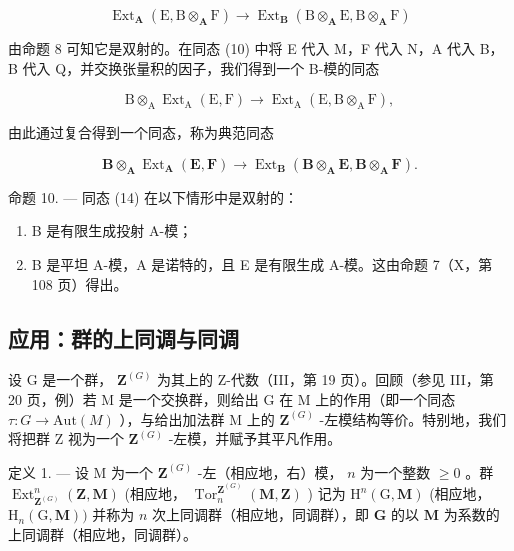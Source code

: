 \[
\operatorname{Ext} _ {\mathbf {A}} \left(\mathrm{E}, \mathrm{B} \otimes_ {\mathbf {A}} \mathrm{F}\right)\rightarrow \operatorname{Ext} _ {\mathbf {B}} \left(\mathrm{B} \otimes_ {\mathbf {A}} \mathrm{E}, \mathrm{B} \otimes_ {\mathbf {A}} \mathrm{F}\right)
\]

由命题 8 可知它是双射的。在同态 (10) 中将 E 代入 M，F 代入 N，A 代入 B，B 代入 Q，并交换张量积的因子，我们得到一个 B-模的同态

\[
\mathrm{B} \otimes_ {\mathrm{A}} \operatorname{Ext} _ {\mathrm{A}} (\mathrm{E}, \mathrm{F}) \rightarrow \operatorname{Ext} _ {\mathrm{A}} (\mathrm{E}, \mathrm{B} \otimes_ {\mathrm{A}} \mathrm{F}),
\]

由此通过复合得到一个同态，称为典范同态

\[
\mathbf {B} \otimes_ {\mathbf {A}} \operatorname{Ext} _ {\mathbf {A}} (\mathbf {E}, \mathbf {F}) \rightarrow \operatorname{Ext} _ {\mathbf {B}} (\mathbf {B} \otimes_ {\mathbf {A}} \mathbf {E}, \mathbf {B} \otimes_ {\mathbf {A}} \mathbf {F}).\tag{14}
\]

命题 10. --- 同态 (14) 在以下情形中是双射的：

\begin{enumerate}
\def\labelenumi{\alph{enumi})}
\item
  B 是有限生成投射 A-模；
\item
  B 是平坦 A-模，A 是诺特的，且 E 是有限生成 A-模。这由命题 7（X，第 108 页）得出。
\end{enumerate}

\subsection{应用：群的上同调与同调}

设 G 是一个群， \(\mathbf{Z}^{(G)}\) 为其上的 Z-代数（III，第 19 页）。回顾（参见 III，第 20 页，例）若 M 是一个交换群，则给出 G 在 M 上的作用（即一个同态 \(\tau: G \to \text{Aut}(M)\) ），与给出加法群 M 上的 \(\mathbf{Z}^{(G)}\) -左模结构等价。特别地，我们将把群 Z 视为一个 \(\mathbf{Z}^{(G)}\) -左模，并赋予其平凡作用。

定义 1. --- 设 M 为一个 \(\mathbf{Z}^{(G)}\) -左（相应地，右）模， \(n\) 为一个整数 \(\geqslant 0\) 。群 \(\operatorname{Ext}_{\mathbf{Z}^{(G)}}^{n}(\mathbf{Z}, \mathbf{M})\) (相应地， \(\operatorname{Tor}_{n}^{\mathbf{Z}^{(G)}}(\mathbf{M}, \mathbf{Z})\) ) 记为 \(\mathrm{H}^{n}(\mathrm{G}, \mathbf{M})\) (相应地， \(\mathrm{H}_{n}(\mathrm{G}, \mathbf{M}))\) 并称为 \(n\) 次上同调群（相应地，同调群），即 \(\mathbf{G}\) 的以 \(\mathbf{M}\) 为系数的上同调群（相应地，同调群）。

